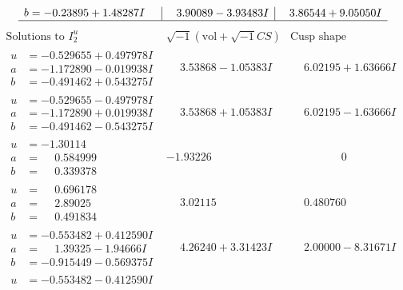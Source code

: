 \documentclass[1p]{elsarticle_modified}
\theoremstyle{definition}
\newcommand{\I}{\sqrt{-1}}
\begin{document}
$$\begin{array}{c|c|c}
\begin{aligned}
b &= -0.23895 + 1.48287 I\end{aligned}
 & \phantom{-}3.90089 - 3.93483 I & \phantom{-}3.86544 + 9.05050 I\\
 \hline 
 \end{array}$$\newpage$$\begin{array}{c|c|c}  
\text{Solutions to }I^u_{2}& \I (\text{vol} + \sqrt{-1}CS) & \text{Cusp shape}\\
 \hline 
\begin{aligned}
u &= -0.529655 + 0.497978 I \\
a &= -1.172890 - 0.019938 I \\
b &= -0.491462 + 0.543275 I\end{aligned}
 & \phantom{-}3.53868 - 1.05383 I & \phantom{-}6.02195 + 1.63666 I \\ \hline\begin{aligned}
u &= -0.529655 - 0.497978 I \\
a &= -1.172890 + 0.019938 I \\
b &= -0.491462 - 0.543275 I\end{aligned}
 & \phantom{-}3.53868 + 1.05383 I & \phantom{-}6.02195 - 1.63666 I \\ \hline\begin{aligned}
u &= -1.30114\phantom{ +0.000000I} \\
a &= \phantom{-}0.584999\phantom{ +0.000000I} \\
b &= \phantom{-}0.339378\phantom{ +0.000000I}\end{aligned}
 & -1.93226\phantom{ +0.000000I} & \phantom{-0.000000 } 0 \\ \hline\begin{aligned}
u &= \phantom{-}0.696178\phantom{ +0.000000I} \\
a &= \phantom{-}2.89025\phantom{ +0.000000I} \\
b &= \phantom{-}0.491834\phantom{ +0.000000I}\end{aligned}
 & \phantom{-}3.02115\phantom{ +0.000000I} & \phantom{-}0.480760\phantom{ +0.000000I} \\ \hline\begin{aligned}
u &= -0.553482 + 0.412590 I \\
a &= \phantom{-}1.39325 - 1.94666 I \\
b &= -0.915449 - 0.569375 I\end{aligned}
 & \phantom{-}4.26240 + 3.31423 I & \phantom{-}2.00000 - 8.31671 I \\ \hline\begin{aligned}
u &= -0.553482 - 0.412590 I \\

\end{aligned}
\end{array}$$
\end{document}
